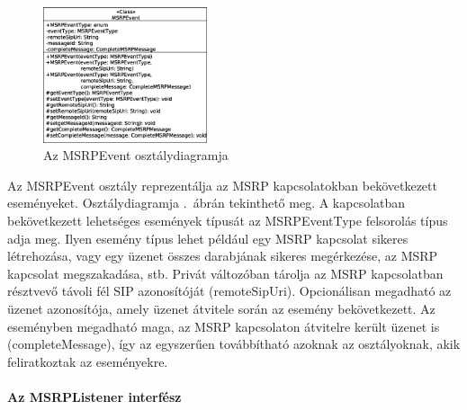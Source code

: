 \begin{figure}
  \vspace{-15pt}
  \begin{center}
    \includegraphics[width=0.43\textwidth]{img/class_diagrams/MSRPEvent.eps}
  \end{center}
  \vspace{-15pt}
  \captionsetup{font=scriptsize}
  \caption{Az MSRPEvent osztálydiagramja}
   \label{fig:class_event}
  \vspace{-10pt}
\end{figure}
Az MSRPEvent osztály reprezentálja az MSRP kapcsolatokban bekövetkezett eseményeket. Osztálydiagramja .~ábrán tekinthető meg. A kapcsolatban bekövetkezett lehetséges események típusát az MSRPEventType felsorolás típus adja meg. Ilyen esemény típus lehet például egy MSRP kapcsolat sikeres létrehozása, vagy egy üzenet összes darabjának sikeres megérkezése, az MSRP kapcsolat megszakadása, stb. Privát változóban tárolja az MSRP kapcsolatban résztvevő távoli fél SIP azonosítóját (remoteSipUri). Opcionálisan megadható az üzenet azonosítója, amely üzenet átvitele során az esemény bekövetkezett. Az eseményben megadható maga, az MSRP kapcsolaton átvitelre került üzenet is (completeMessage), így az egyszerűen továbbítható azoknak az osztályoknak, akik feliratkoztak az eseményekre.

\paragraph{Az MSRPListener interfész\\}
\label{sec:msrp_listener}

